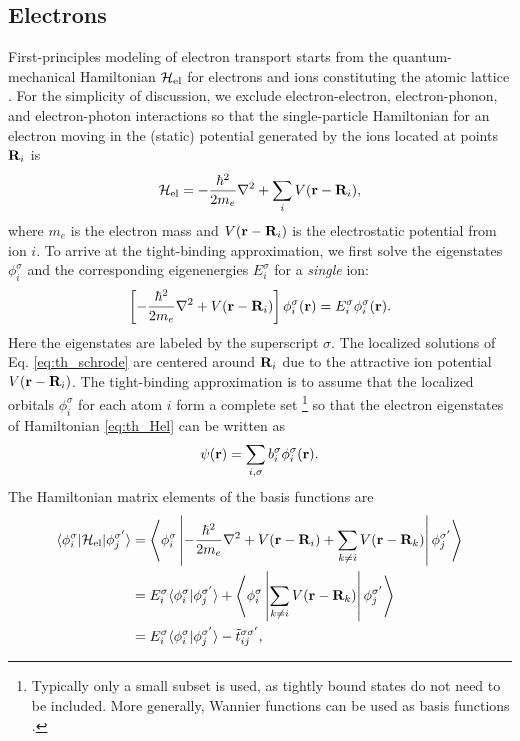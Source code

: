 \subsection{Electrons}
\label{sec:th_eom2_electron}

First-principles modeling of electron transport starts from the quantum-mechanical Hamiltonian $\mathcal{H}_{\textrm{el}}$ for electrons and ions constituting the atomic lattice \cite{ashcroftmermin}. For the simplicity of discussion, we exclude electron-electron, electron-phonon, and electron-photon interactions so that the single-par\-ti\-cle Hamiltonian for an electron moving in the (static) potential generated by the ions located at points $\mathbf{R}_i$ is \cite{ashcroftmermin}
\begin{equation}
 \mathcal{H}_{\textrm{el}} = - \frac{\hbar^2}{2m_e} \nabla^2  + \sum_i V(\mathbf{r}-\mathbf{R}_i), \label{eq:th_Hel}
\end{equation}
where $m_e$ is the electron mass and $V(\mathbf{r}-\mathbf{R}_i)$ is the electrostatic potential from ion $i$. To arrive at the tight-binding approximation, we first solve the eigenstates $\phi_i^{\sigma}$ and the corresponding eigenenergies $E_i^{\sigma}$ for a \textit{single} ion:
\begin{equation}
 \left[ - \frac{\hbar^2}{2m_e} \nabla^2  +  V(\mathbf{r}-\mathbf{R}_i) \right] \phi_i^{\sigma} (\mathbf{r}) = E_i^{\sigma} \phi_i^{\sigma}(\mathbf{r}). \label{eq:th_schrode}
\end{equation}
Here the eigenstates are labeled by the superscript $\sigma$. The localized solutions of Eq. \eqref{eq:th_schrode} are centered around $\mathbf{R}_i$ due to the attractive ion potential $V(\mathbf{r}-\mathbf{R}_i)$. The tight-binding approximation is to assume that the localized orbitals $\phi_i^{\sigma}$ for each atom $i$ form a complete set \footnote{Typically only a small subset is used, as tightly bound states do not need to be included. More generally, Wannier functions can be used as basis functions \cite{ashcroftmermin}.} so that the electron eigenstates of Hamiltonian \eqref{eq:th_Hel} can be written as
\begin{equation}
 \psi(\mathbf{r}) = \sum_{i,\sigma} b_i^{\sigma} \phi_{i}^{\sigma}(\mathbf{r}).
\end{equation}
The Hamiltonian matrix elements of the basis functions are
\begin{alignat}{2}
 \langle \phi_i^{\sigma} | \mathcal{H}_{\textrm{el}} | \phi_j^{\sigma'} \rangle &= \left\langle \phi_i^{\sigma} \left| - \frac{\hbar^2}{2m_e} \nabla^2  +V(\mathbf{r}-\mathbf{R}_i)+ \sum_{k\neq i} V(\mathbf{r}-\mathbf{R}_k) \right |\phi_j^{\sigma'} \right\rangle \\
 &= E_i^{\sigma} \langle \phi_i^{\sigma}|\phi_j^{\sigma'} \rangle + \left\langle \phi_i^{\sigma} \left| \sum_{k\neq i} V(\mathbf{r}-\mathbf{R}_k) \right| \phi_j^{\sigma'} \right\rangle \label{eq:th_Helements1} \\
  & = E_i^{\sigma} \langle \phi_i^{\sigma}|\phi_j^{\sigma'} \rangle  - \tilde t_{ij}^{\sigma\sigma'}, \label{eq:th_Helements}
\end{alignat}
